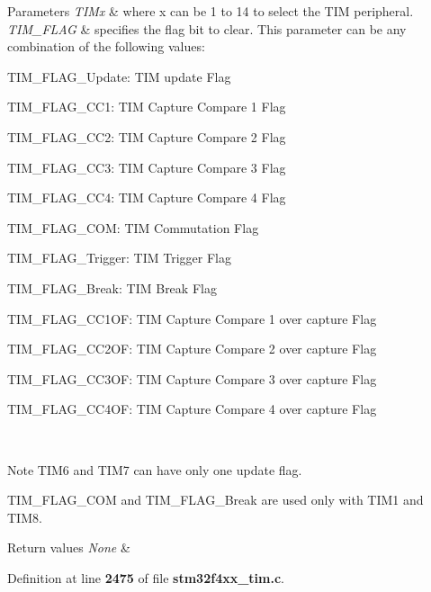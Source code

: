 \begin{DoxyParams}{Parameters}
{\em T\+I\+Mx} & where x can be 1 to 14 to select the T\+IM peripheral. \\
\hline
{\em T\+I\+M\+\_\+\+F\+L\+AG} & specifies the flag bit to clear. This parameter can be any combination of the following values\+: \begin{DoxyItemize}
\item T\+I\+M\+\_\+\+F\+L\+A\+G\+\_\+\+Update\+: T\+IM update Flag \item T\+I\+M\+\_\+\+F\+L\+A\+G\+\_\+\+C\+C1\+: T\+IM Capture Compare 1 Flag \item T\+I\+M\+\_\+\+F\+L\+A\+G\+\_\+\+C\+C2\+: T\+IM Capture Compare 2 Flag \item T\+I\+M\+\_\+\+F\+L\+A\+G\+\_\+\+C\+C3\+: T\+IM Capture Compare 3 Flag \item T\+I\+M\+\_\+\+F\+L\+A\+G\+\_\+\+C\+C4\+: T\+IM Capture Compare 4 Flag \item T\+I\+M\+\_\+\+F\+L\+A\+G\+\_\+\+C\+OM\+: T\+IM Commutation Flag \item T\+I\+M\+\_\+\+F\+L\+A\+G\+\_\+\+Trigger\+: T\+IM Trigger Flag \item T\+I\+M\+\_\+\+F\+L\+A\+G\+\_\+\+Break\+: T\+IM Break Flag \item T\+I\+M\+\_\+\+F\+L\+A\+G\+\_\+\+C\+C1\+OF\+: T\+IM Capture Compare 1 over capture Flag \item T\+I\+M\+\_\+\+F\+L\+A\+G\+\_\+\+C\+C2\+OF\+: T\+IM Capture Compare 2 over capture Flag \item T\+I\+M\+\_\+\+F\+L\+A\+G\+\_\+\+C\+C3\+OF\+: T\+IM Capture Compare 3 over capture Flag \item T\+I\+M\+\_\+\+F\+L\+A\+G\+\_\+\+C\+C4\+OF\+: T\+IM Capture Compare 4 over capture Flag\end{DoxyItemize}
\\
\hline
\end{DoxyParams}
\begin{DoxyNote}{Note}
T\+I\+M6 and T\+I\+M7 can have only one update flag. 

T\+I\+M\+\_\+\+F\+L\+A\+G\+\_\+\+C\+OM and T\+I\+M\+\_\+\+F\+L\+A\+G\+\_\+\+Break are used only with T\+I\+M1 and T\+I\+M8.
\end{DoxyNote}

\begin{DoxyRetVals}{Return values}
{\em None} & \\
\hline
\end{DoxyRetVals}


Definition at line \textbf{ 2475} of file \textbf{ stm32f4xx\+\_\+tim.\+c}.


